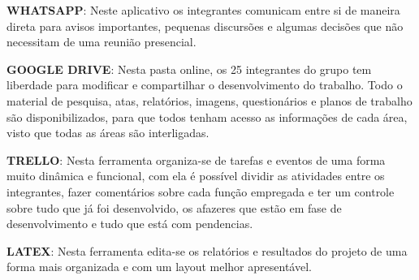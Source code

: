 \textbf{WHATSAPP}: 
Neste aplicativo os integrantes comunicam entre si de maneira direta para avisos importantes, pequenas discursões e algumas decisões que não necessitam de uma reunião presencial.

\textbf{GOOGLE DRIVE}: 
Nesta pasta online, os 25 integrantes do grupo tem liberdade para modificar e compartilhar o desenvolvimento do trabalho. Todo o material de pesquisa, atas, relatórios, imagens, questionários e planos de trabalho são disponibilizados, para que todos tenham acesso as informações de cada área, visto que todas as áreas são interligadas.

\textbf{TRELLO}:
Nesta ferramenta organiza-se de tarefas e eventos de uma forma muito dinâmica e funcional, com ela é possível dividir as atividades entre os integrantes, fazer comentários sobre cada função empregada e ter um controle sobre tudo que já foi desenvolvido, os afazeres que estão em fase de desenvolvimento e tudo que está com pendencias.

\textbf{LATEX}:
Nesta ferramenta edita-se os relatórios e resultados do projeto de uma forma mais organizada e com um layout melhor apresentável.






%
%
%
%
%


